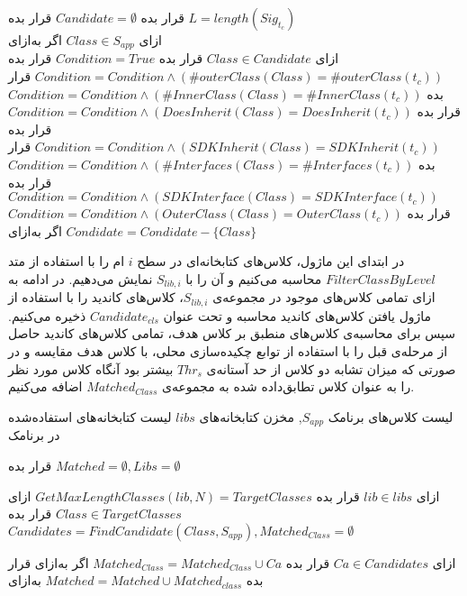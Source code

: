  قرار بده $Candidate = \emptyset$ 
 قرار بده $L= length(Sig_{t_c})$  \\
‌ازای $Class \in S_{app}$ 
‌اگر
‌به‌ازای\\
‌ازای $Class \in Candidate$ 
 قرار بده $Condition = True$
 قرار بده $Condition= Condition \wedge (\#outerClass(Class) = \#outerClass(t_c))$
 قرار بده $Condition= Condition \wedge (\#InnerClass(Class) = \#InnerClass(t_c))$
 قرار بده $Condition= Condition \wedge (DoesInherit(Class) = DoesInherit(t_c))$
 قرار بده $Condition= Condition \wedge (SDKInherit(Class) = SDKInherit(t_c))$
 قرار بده $Condition= Condition \wedge (\#Interfaces(Class) = \#Interfaces(t_c))$
 قرار بده $Condition= Condition \wedge (SDKInterface(Class) = SDKInterface(t_c))$
 قرار بده $Condition= Condition \wedge (OuterClass(Class) = OuterClass(t_c))$
$Condidate=Condidate - \{Class\}$
‌اگر
‌به‌ازای
 
 در ابتدای این ماژول، کلاس‌های کتابخانه‌ای در سطح $i$ ام را با استفاده از متد $FilterClassByLevel$ محاسبه می‌کنیم و آن‌ را با $S_{lib,i}$ نمایش می‌دهیم. در ادامه به ازای تمامی کلاس‌های موجود در مجموعه‌ی  $S_{lib,i}$، کلاس‌های کاندید را با استفاده از ماژول یافتن کلاس‌های کاندید محاسبه و تحت عنوان $Candidate_{cls}$ ذخیره می‌کنیم.  سپس برای محاسبه‌ی کلاس‌های منطبق بر کلاس هدف، تمامی کلاس‌های کاندید حاصل از مرحله‌ی قبل را با استفاده از توابع چکیده‌سازی محلی، با کلاس هدف مقایسه و در صورتی که میزان تشابه دو کلاس از حد آستانه‌ی $Thr_{s}$ بیشتر بود آنگاه کلاس مورد نظر را به عنوان کلاس تطابق‌داده شده به مجموعه‌ی $Matched_{Class}$ اضافه می‌کنیم.  
 
 
  لیست کلاس‌های برنامک $S_{app}$, مخزن کتابخانه‌های $libs$
  لیست کتابخانه‌های استفاده‌شده در برنامک 

 
  قرار بده $Matched=\emptyset ,Libs = \emptyset$ 

 ‌ازای $lib \in libs$ 
 قرار بده $GetMaxLengthClasses‬‬(lib,N)‫‪ = TargetClasses$
‌ازای $Class \in TargetClasses$
 قرار بده  $Candidates = FindCandidate(Class,S_{app}), Matched_{Class} = \emptyset$   

‌ازای $Ca \in Candidates$
 قرار بده $Matched_{Class} = Matched_{Class} \cup {Ca}$
‌اگر
‌به‌ازای
 قرار بده $Matched = Matched \cup Matched_{class}$
‌به‌ازای
 
